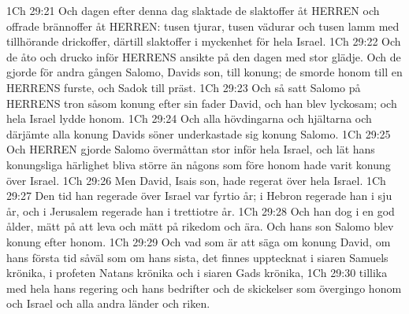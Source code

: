1Ch 29:21  Och dagen efter denna dag slaktade de slaktoffer åt HERREN och offrade brännoffer åt HERREN: tusen tjurar, tusen vädurar och tusen lamm med tillhörande drickoffer, därtill slaktoffer i myckenhet för hela Israel.
1Ch 29:22  Och de åto och drucko inför HERRENS ansikte på den dagen med stor glädje. Och de gjorde för andra gången Salomo, Davids son, till konung; de smorde honom till en HERRENS furste, och Sadok till präst.
1Ch 29:23  Och så satt Salomo på HERRENS tron såsom konung efter sin fader David, och han blev lyckosam; och hela Israel lydde honom.
1Ch 29:24  Och alla hövdingarna och hjältarna och därjämte alla konung Davids söner underkastade sig konung Salomo.
1Ch 29:25  Och HERREN gjorde Salomo övermåttan stor inför hela Israel, och lät hans konungsliga härlighet bliva större än någons som före honom hade varit konung över Israel.
1Ch 29:26  Men David, Isais son, hade regerat över hela Israel.
1Ch 29:27  Den tid han regerade över Israel var fyrtio år; i Hebron regerade han i sju år, och i Jerusalem regerade han i trettiotre år.
1Ch 29:28  Och han dog i en god ålder, mätt på att leva och mätt på rikedom och ära. Och hans son Salomo blev konung efter honom.
1Ch 29:29  Och vad som är att säga om konung David, om hans första tid såväl som om hans sista, det finnes upptecknat i siaren Samuels krönika, i profeten Natans krönika och i siaren Gads krönika,
1Ch 29:30  tillika med hela hans regering och hans bedrifter och de skickelser som övergingo honom och Israel och alla andra länder och riken.



